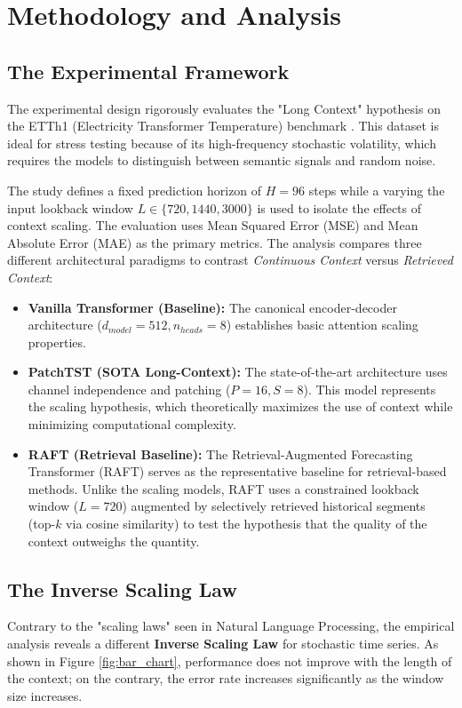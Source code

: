 \documentclass{article} %
\begin{document}
\section{Methodology and Analysis}

\subsection{The Experimental Framework}

The experimental design rigorously evaluates the "Long Context" hypothesis on the ETTh1 (Electricity Transformer Temperature) benchmark \citep{zhou2021informer}. This dataset is ideal for stress testing  because of its high-frequency stochastic volatility, which requires the models to distinguish between semantic signals and random noise.

The study defines a fixed prediction horizon of $H=96$ steps while a varying the input lookback window $L \in \{720, 1440, 3000\}$ is used to isolate the effects of context scaling. The evaluation uses Mean Squared Error (MSE) and Mean Absolute Error (MAE) as the primary metrics. The analysis compares three different architectural paradigms to contrast \textit{Continuous Context} versus \textit{Retrieved Context}:

\begin{itemize}
    \item \textbf{Vanilla Transformer (Baseline):} The canonical encoder-decoder architecture ($d_{model}=512, n_{heads}=8$) establishes basic attention scaling properties.
    \item \textbf{PatchTST (SOTA Long-Context):} The state-of-the-art architecture \citep{nie2023time} uses channel independence and patching ($P=16, S=8$). This model represents the scaling hypothesis, which theoretically maximizes the use of context while minimizing computational complexity.
    \item \textbf{RAFT (Retrieval Baseline):} The Retrieval-Augmented Forecasting Transformer (RAFT) \citep{han2025raft} serves as the representative baseline for retrieval-based methods. Unlike the scaling models, RAFT uses a constrained lookback window ($L=720$) augmented by selectively retrieved historical segments (top-$k$ via cosine similarity) to test the hypothesis that the quality of the context outweighs the quantity.
\end{itemize}

\subsection{The Inverse Scaling Law}
Contrary to the "scaling laws" seen in Natural Language Processing, the empirical analysis reveals a different \textbf{Inverse Scaling Law} for stochastic time series. As shown in Figure \ref{fig:bar_chart}, performance does not improve with the length of the context; on the contrary, the error rate increases significantly as the window size increases.
\end{document}
